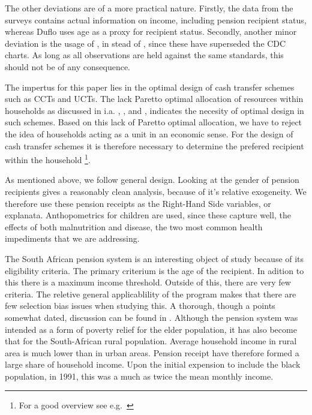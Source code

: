 \begin{refsection}
The other deviations are of a more practical nature.
Firstly, the data from the \textcite{saldru2008nids,saldru2012nids} surveys contains actual information on income,
including pension recipient status, whereas Duflo uses age as a proxy for recipient status.
Secondly, another minor deviation is the usage of \textcite[WHO Child Growth Standards]{who2006child},
in stead of \textcite[CDC Growth Charts: United States]{nchs2000cdc}, since these have superseded the CDC charts.
As long as all observations are held against the same standards, this should not be of any consequence.

The impertus for this paper lies in the optimal design of cash transfer schemes such as CCTs and UCTs.
The lack Paretto optimal allocation of resources within households as discussed in i.a.
\textcite{udry1995gender}, \textcite{udry1996gender}, and \textcite{duflo2004intrahousehold},
indicates the necesity of optimal design in such schemes.
Based on this lack of Paretto optimal allocation,
we have to reject the idea of households acting as a unit in an economic sense.
For the design of cash transfer schemes it is therefore necessary to determine the prefered recipient within the household
\footnote{For a good overview see e.g.~\textcite{haddad1997intrahousehold}}.

As mentioned above, we follow \textcite{duflo2000child,duflo2003grandmothers} general design.
Looking at the gender of pension recipients gives a reasonably clean analysis,
because of it's relative exogeneity.
We therefore use these pension receipts as the Right-Hand Side variables, or explanata.
Anthopometrics for children are used, since these capture well, the effects of both malnutrition and disease,
the two most common health impediments that we are addressing.

The South African pension system is an interesting object of study because of its eligibility criteria.
The primary criterium is the age of the recipient.
In adition to this there is a maximum income threshold.
Outside of this, there are very few criteria.
The reletive general applicablility of the program makes that there are few selection bias issues when studying this.
A thorough, though a points somewhat dated, discussion can be found in \textcite{case1998large}.
Although the pension system was intended as a form of poverty relief for the elder population,
it has also become that for the South-African rural population\parencite{tangwe2013impact}.
Average household income in rural area is much lower than in urban areas.
Pension receipt have therefore formed a large share of household income.
Upon the initial expension to include the black population, in 1991,
this was a much as twice the mean monthly income.


\end{refsection}
